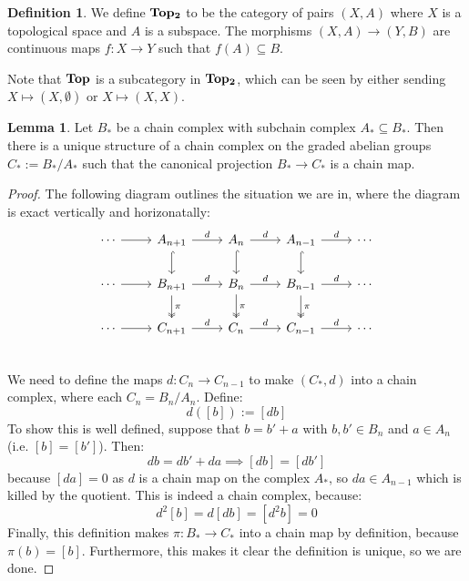 \documentclass[11pt, oneside]{amsart}   	%
\theoremstyle{definition}
\newtheorem{definition}{Definition}[section]
\newtheorem{lemma}[theorem]{Lemma}
\begin{document}
\begin{definition}
	We define $\bf{Top_2}$ to be the category of pairs $(X, A)$ where $X$ is a topological space and $A$ is a subspace. The 
	morphisms $(X, A)\rightarrow (Y, B)$ are continuous maps $f : X\rightarrow Y$ such that $f(A)\subseteq B$. 
\end{definition}

Note that $\bf{Top}$ is a subcategory in $\bf{Top_2}$, which can be seen by either sending $X\mapsto (X, \emptyset)$ or 
$X\mapsto (X, X)$. 


\begin{lemma}
	Let $B_*$ be a chain complex with subchain complex $A_*\subseteq B_*$. Then there is a unique structure of a chain 
	complex on the graded abelian groups $C_* := B_* / A_*$ such that the canonical projection $B_*\rightarrow C_*$ 
	is a chain map. 
\end{lemma}

\begin{proof}
	The following diagram outlines the situation we are in, where the diagram is exact vertically and horizonatally:
	\[ \begin{tikzcd}
		\cdots \arrow[r] & A_{n + 1} \arrow[r, "d"] \arrow[d, hook] & A_n\arrow[r, "d"] \arrow[d, hook] & A_{n - 1}\arrow[r, "d"] 
		\arrow[d, hook] & \cdots \\
		\cdots \arrow[r] & B_{n + 1} \arrow[r, "d"] \arrow[d, "\pi", twoheadrightarrow] & B_n\arrow[r, "d"]\arrow[d, "\pi", 
		twoheadrightarrow] & B_{n - 1} \arrow[r, "d"] \arrow[d, "\pi", twoheadrightarrow] & \cdots \\
		\cdots \arrow[r] & C_{n + 1}\arrow[r, "d"] & C_n\arrow[r, "d"] & C_{n - 1}\arrow[r, "d"] & \cdots \\
	\end{tikzcd} \]
	We need to define the maps $d : C_n\rightarrow C_{n - 1}$ to make $(C_*, d)$ into a chain complex, where each 
	$C_n = B_n / A_n$. Define:
	\begin{equation}
		d([b]) := [db]
	\end{equation}
	To show this is well defined, suppose that $b = b' + a$ with $b, b'\in B_n$ and $a\in A_n$ (i.e. $[b] = [b']$). Then:
	\begin{equation}
		db = db' + da\implies [db] = [db']
	\end{equation}
	because $[da] = 0$ as $d$ is a chain map on the complex $A_*$, so $da\in A_{n - 1}$ which is killed by the quotient. 
	This is indeed a chain complex, because:
	\begin{equation}
		d^2[b] = d[db] = [d^2 b] = 0
	\end{equation}
	Finally, this definition makes $\pi : B_*\rightarrow C_*$ into a chain map by definition, because $\pi(b) = [b]$. Furthermore, 
	this makes it clear the definition is unique, so we are done.
\end{proof}
\end{document}
